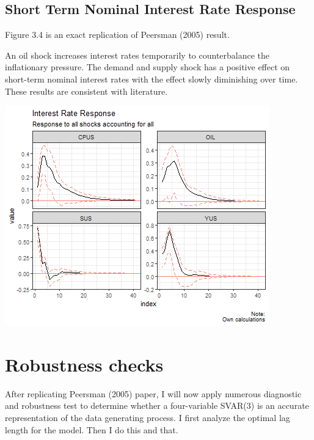 \documentclass[11pt,preprint, authoryear]{elsarticle}
\let\origfigure\figure
\let\endorigfigure\endfigure
\renewenvironment{figure}[1][2] {
    \expandafter\origfigure\expandafter[H]
} {
    \endorigfigure
}
\numberwithin{equation}{section}
\numberwithin{figure}{section}
\numberwithin{table}{section}
\begin{document}
\hypertarget{short-term-nominal-interest-rate-response}{%
\subsection{Short Term Nominal Interest Rate
Response}\label{short-term-nominal-interest-rate-response}}

Figure 3.4 is an exact replication of Peersman (2005) result.

An oil shock increases interest rates temporarily to counterbalance the
inflationary pressure. The demand and supply shock has a positive effect
on short-term nominal interest rates with the effect slowly diminishing
over time. These results are consistent with literature.

\begin{figure}[H]

{\centering \includegraphics{replication_files/figure-latex/Figure5-1} 

}

\caption{Interest Rate Response\label{Figure5}}\label{fig:Figure5}
\end{figure}

\hypertarget{robustness-checks}{%
\section{Robustness checks}\label{robustness-checks}}

After replicating Peersman (2005) paper, I will now apply numerous
diagnostic and robustness test to determine whether a four-variable
SVAR(3) is an accurate representation of the data generating process. I
first analyze the optimal lag length for the model. Then I do this and
that.
\end{document}
